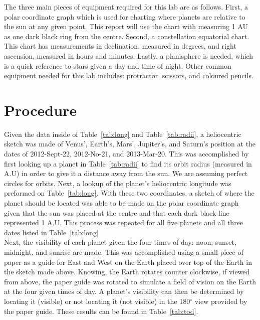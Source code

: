 \documentclass{article}
\begin{document}
The three main pieces of equipment required for this lab are as follows. First, a polar coordinate graph which is used for
charting where planets are relative to the sun at any given point. This report will use the chart with measuring 1 AU as 
one dark black ring from the centre. Second, a constellation equatorial chart. This chart has measurements in declination, 
measured in degrees, and right ascension, measured in hours and minutes. Lastly, a planisphere is needed, which is a
quick reference to stars given a day and time of night. Other common equipment needed for this lab includes: protractor,
scissors, and coloured pencils.




\section{Procedure}

Given the data inside of Table~\ref{tab:long} and Table~\ref{tab:radii}, a heliocentric sketch was made of Venus', Earth's, Mars', 
Jupiter's, and Saturn's position at the dates of 2012-Sept-22, 2012-No-21, and 2013-Mar-20. This was accomplished by first
looking up a planet in Table~\ref{tab:radii} to find its orbit radius (measured in A.U) in order to give it a distance away from the
sun. We are assuming perfect circles for orbits. Next, a lookup of the planet's heliocentric longitude was preformed on 
Table~\ref{tab:long}. With these two coordinates, a sketch of where the planet should be located was able to be made on the 
polar coordinate graph given that the sun was placed at the centre and that each dark black line represented 1 A.U. This process
was repeated for all five planets and all three dates listed in Table~\ref{tab:long}\\

Next, the visibility of each planet given the four times of day: noon, sunset, midnight, and sunrise are made. This was accomplished
using a small piece of paper as a guide for East and West on the Earth placed over top of the Earth in the sketch made above. Knowing,
the Earth rotates counter clockwise, if viewed from above, the paper guide was rotated to simulate a field of vision on the Earth at
the four given times of day. A planet's visibility can then be determined by locating it (visible) or not locating it (not visible) in the
180$^\circ$ view provided by the paper guide. These results can be found in Table~\ref{tab:tod}.\\
\end{document}
